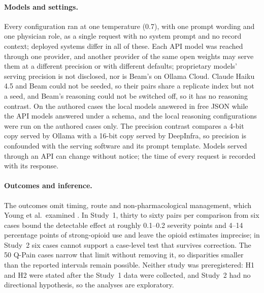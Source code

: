 \paragraph{Models and settings.} Every configuration ran at one temperature
(0.7), with one prompt wording and one physician role, as a single request with
no system prompt and no record context; deployed systems differ in all of these.
Each API model was reached through one provider, and another provider of the
same open weights may serve them at a different precision or with different
defaults; proprietary models' serving precision is not disclosed, nor is
Beam's on Ollama Cloud. Claude Haiku 4.5 and Beam could not be seeded, so their
pairs share a replicate index but not a seed, and Beam's reasoning could not be
switched off, so it has no reasoning contrast. On
the authored cases the local models answered in free JSON while the API models
answered under a schema, and the local reasoning configurations were run on the
authored cases only. The precision contrast compares a 4-bit copy served by Ollama with a 16-bit copy
served by DeepInfra, so precision is confounded with the serving software and its
prompt template. Models served through an API can change without notice;
the time of every request is recorded with its response.

\paragraph{Outcomes and inference.} The outcomes omit timing, route and
non-pharmacological management, which Young et al.\ examined
\cite{young2025racial}. In Study~1, thirty to sixty pairs per comparison from six
cases bound the detectable effect at roughly 0.1--0.2 severity points and 4--14
percentage points of strong-opioid use and leave the opioid estimates imprecise;
in Study~2 six cases cannot support a case-level test that survives correction.
The 50 Q-Pain cases narrow that limit without removing it, so disparities
smaller than the reported intervals remain possible. Neither study was
preregistered: H1 and H2 were stated after the Study~1 data were collected, and
Study~2 had no directional hypothesis, so the analyses are exploratory.
